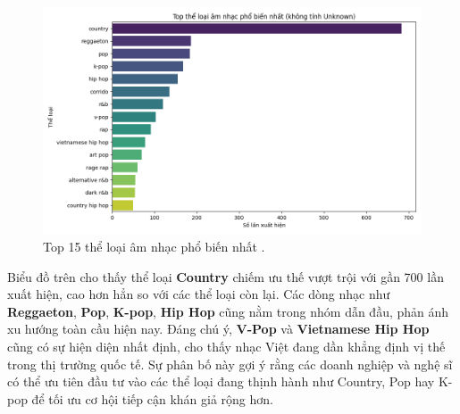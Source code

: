 \begin{enumerate}[label=\arabic*]
    \begin{figure}[H] %
            \centering
            \includegraphics[width=1.0\textwidth]{../graphics/data3/Output/step1/genre_distribution.png}
            \caption{Top 15 thể loại âm nhạc phổ biến nhất .}
            \label{fig:missing}
    \end{figure}
    Biểu đồ trên cho thấy thể loại \textbf{Country} chiếm ưu thế vượt trội với gần 700 lần xuất hiện, cao hơn hẳn so với các thể loại còn lại. Các dòng nhạc như \textbf{Reggaeton}, \textbf{Pop}, \textbf{K-pop}, \textbf{Hip Hop} cũng nằm trong nhóm dẫn đầu, phản ánh xu hướng toàn cầu hiện nay. Đáng chú ý, \textbf{V-Pop} và \textbf{Vietnamese Hip Hop} cũng có sự hiện diện nhất định, cho thấy nhạc Việt đang dần khẳng định vị thế trong thị trường quốc tế. Sự phân bố này gợi ý rằng các doanh nghiệp và nghệ sĩ có thể ưu tiên đầu tư vào các thể loại đang thịnh hành như Country, Pop hay K-pop để tối ưu cơ hội tiếp cận khán giả rộng hơn.


\end{enumerate}
